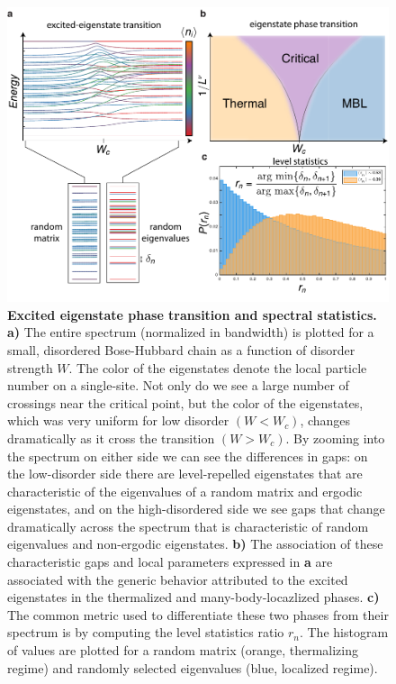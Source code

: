 \begin{figure}[t!]
		\includegraphics[width=\columnwidth]{figures/ch6/excited_eig_qpt.pdf} 
		\caption{\textbf{Excited eigenstate phase transition and spectral statistics. a)}  The entire spectrum (normalized in bandwidth) is plotted for a small, disordered Bose-Hubbard chain as a function of disorder strength $W$. The color of the eigenstates denote the local particle number on a single-site. Not only do we see a large number of crossings near the critical point, but the color of the eigenstates, which was very uniform for low disorder $(W<W_c)$, changes dramatically as it cross the transition $(W>W_c)$. By zooming into the spectrum on either side we can see the differences in gaps: on the low-disorder side there are level-repelled eigenstates that are characteristic of the eigenvalues of a random matrix and ergodic eigenstates, and on the high-disordered side we see gaps that change dramatically across the spectrum that is characteristic of random eigenvalues and non-ergodic eigenstates. \textbf{b)} The association of these characteristic gaps and local parameters expressed in \textbf{a} are associated with the generic behavior attributed to the excited eigenstates in the thermalized and many-body-locazlized phases. \textbf{c)} The common metric used to differentiate these two phases from their spectrum is by computing the level statistics ratio $r_n$. The histogram of values are plotted for a random matrix (orange, thermalizing regime) and randomly selected eigenvalues (blue, localized regime).}
		\label{fig:ex_eig_qpt}	
\end{figure}


